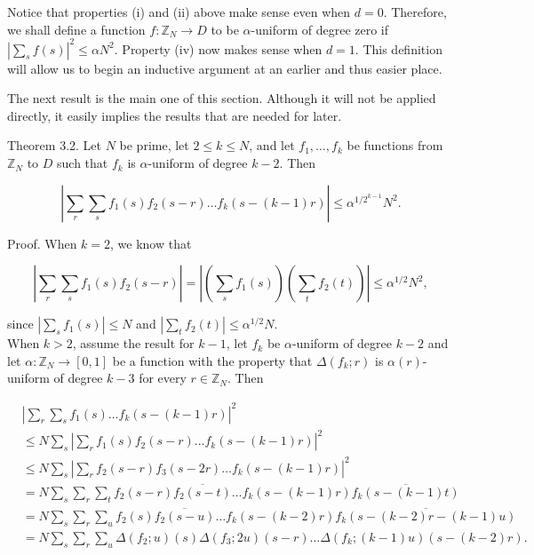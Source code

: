 \documentclass[10pt]{article}
\begin{document}
Notice that properties (i) and (ii) above make sense even when $d=0$. Therefore, we shall define a function $f: \mathbb{Z}_{N} \rightarrow D$ to be $\alpha$-uniform of degree zero if $\left|\sum_{s} f(s)\right|^{2} \leqslant \alpha N^{2}$. Property (iv) now makes sense when $d=1$. This definition will allow us to begin an inductive argument at an earlier and thus easier place.

The next result is the main one of this section. Although it will not be applied directly, it easily implies the results that are needed for later.

Theorem 3.2. Let $N$ be prime, let $2\leqslant k\leqslant N$, and let $f_{1}, \ldots, f_{k}$ be functions from $\mathbb{Z}_{N}$ to $D$ such that $f_{k}$ is $\alpha$-uniform of degree $k-2$. Then

$$
\left|\sum_{r} \sum_{s} f_{1}(s) f_{2}(s-r) \ldots f_{k}(s-(k-1) r)\right| \leqslant \alpha^{1 / 2^{k-1}} N^{2} .
$$

Proof. When $k=2$, we know that

$$
\left|\sum_{r} \sum_{s} f_{1}(s) f_{2}(s-r)\right|=\left|\left(\sum_{s} f_{1}(s)\right)\left(\sum_{t} f_{2}(t)\right)\right| \leqslant \alpha^{1 / 2} N^{2},
$$

since $\left|\sum_{s} f_{1}(s)\right| \leqslant N$ and $\left|\sum_{t} f_{2}(t)\right| \leqslant \alpha^{1 / 2} N$.\\
When $k>2$, assume the result for $k-1$, let $f_{k}$ be $\alpha$-uniform of degree $k-2$ and let $\alpha: \mathbb{Z}_{N} \rightarrow[0,1]$ be a function with the property that $\Delta\left(f_{k} ; r\right)$ is $\alpha(r)$-uniform of degree $k-3$ for every $r \in \mathbb{Z}_{N}$. Then

$$
\begin{aligned}
& \left|\sum_{r} \sum_{s} f_{1}(s) \ldots f_{k}(s-(k-1) r)\right|^{2} \\
& \leqslant N \sum_{s}\left|\sum_{r} f_{1}(s) f_{2}(s-r) \ldots f_{k}(s-(k-1) r)\right|^{2} \\
& \leqslant N \sum_{s}\left|\sum_{r} f_{2}(s-r) f_{3}(s-2 r) \ldots f_{k}(s-(k-1) r)\right|^{2} \\
& =N \sum_{s} \sum_{r} \sum_{t} f_{2}(s-r) \overline{f_{2}(s-t)} \ldots f_{k}(s-(k-1) r) \overline{f_{k}(s-(k-1) t)} \\
& =N \sum_{s} \sum_{r} \sum_{u} f_{2}(s) \overline{f_{2}(s-u)} \ldots f_{k}(s-(k-2) r) \overline{f_{k}(s-(k-2) r-(k-1) u)} \\
& =N \sum_{s} \sum_{r} \sum_{u} \Delta\left(f_{2} ; u\right)(s) \Delta\left(f_{3} ; 2 u\right)(s-r) \ldots \Delta\left(f_{k} ;(k-1) u\right)(s-(k-2) r) .
\end{aligned}
$$
\end{document}
